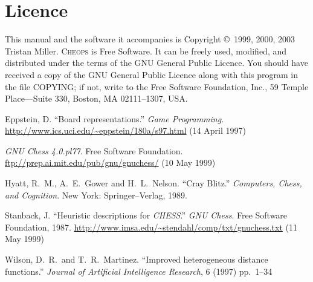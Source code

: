 \documentclass[a4paper]{article}
\begin{document}
\section{Licence}

This manual and the software it accompanies is Copyright \copyright\ 
1999, 2000, 2003 Tristan Miller.  \textsc{Cheops} is Free Software. It
can be freely used, modified, and distributed under the terms of the
GNU General Public Licence.  You should have received a copy of the
GNU General Public Licence along with this program in the file
COPYING; if not, write to the Free Software Foundation, Inc., 59
Temple Place---Suite 330, Boston, MA 02111--1307, USA.

\begin{thebibliography}{99}

 Eppstein, D. ``Board representations.''
  \emph{Game Programming}.
  \url{http://www.ics.uci.edu/~eppstein/180a/s97.html}  (14 April 1997)

 \emph{GNU Chess 4.0.pl77}.  Free Software
  Foundation.  \url{ftp://prep.ai.mit.edu/pub/gnu/gnuchess/} (10 May 1999)

 Hyatt, R.~M., A.~E.~Gower and H.~L.~Nelson.
  ``Cray Blitz.'' \emph{Computers, Chess, and Cognition}.  New York:
  Springer--Verlag, 1989.

 Stanback, J.  ``Heuristic descriptions for
  \emph{CHESS}.''  \emph{GNU Chess}.  Free Software Foundation, 1987.
  \url{http://www.imsa.edu/~stendahl/comp/txt/gnuchess.txt} (11 May 1999)

 Wilson, D.~R.~and T.~R.~Martinez. ``Improved
  heterogeneous distance functions.''  \emph{Journal of Artificial
    Intelligence Research}, 6 (1997) pp.~1--34

\end{thebibliography}
\end{document}
